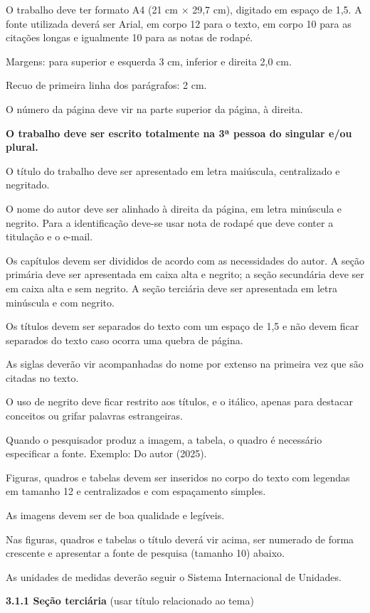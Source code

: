 \documentclass[
]{article}
\begin{document}
O trabalho deve ter formato A4 (21 cm × 29,7 cm), digitado em espaço de
1,5. A fonte utilizada deverá ser Arial, em corpo 12 para o texto, em
corpo 10 para as citações longas e igualmente 10 para as notas de
rodapé.

Margens: para superior e esquerda 3 cm, inferior e direita 2,0 cm.

Recuo de primeira linha dos parágrafos: 2 cm.

O número da página deve vir na parte superior da página, à direita.

\textbf{O trabalho deve ser escrito totalmente na 3ª pessoa do singular
e/ou plural.}

O título do trabalho deve ser apresentado em letra maiúscula,
centralizado e negritado.

O nome do autor deve ser alinhado à direita da página, em letra
minúscula e negrito. Para a identificação deve-se usar nota de rodapé
que deve conter a titulação e o e-mail.

Os capítulos devem ser divididos de acordo com as necessidades do autor.
A seção primária deve ser apresentada em caixa alta e negrito; a seção
secundária deve ser em caixa alta e sem negrito. A seção terciária deve
ser apresentada em letra minúscula e com negrito.

Os títulos devem ser separados do texto com um espaço de 1,5 e não devem
ficar separados do texto caso ocorra uma quebra de página.

As siglas deverão vir acompanhadas do nome por extenso na primeira vez
que são citadas no texto.

O uso de negrito deve ficar restrito aos títulos, e o itálico, apenas
para destacar conceitos ou grifar palavras estrangeiras.

Quando o pesquisador produz a imagem, a tabela, o quadro é necessário
especificar a fonte. Exemplo: Do autor (2025).

Figuras, quadros e tabelas devem ser inseridos no corpo do texto com
legendas em tamanho 12 e centralizados e com espaçamento simples.

As imagens devem ser de boa qualidade e legíveis.

Nas figuras, quadros e tabelas o título deverá vir acima, ser numerado
de forma crescente e apresentar a fonte de pesquisa (tamanho 10) abaixo.

As unidades de medidas deverão seguir o Sistema Internacional de
Unidades.

\textbf{3.1.1 Seção terciária} (usar título relacionado ao tema)
\end{document}
